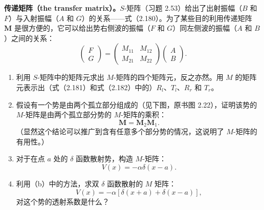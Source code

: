 \textbf{传递矩阵（the transfer matrix）。}$S$-矩阵（习题 2.53）给出了出射振幅（$B$ 和 $F$）与入射振幅（$A$ 和 $G$）的关系——式（2.180）。为了某些目的利用传递矩阵 $\boldsymbol M$ 是很方便的，它可以给出势右侧波的振幅（$F$ 和 $G$）同左侧波的振幅（$A$ 和 $B$）之间的关系：
\[
\begin{pmatrix}F\\G\end{pmatrix}
=\begin{pmatrix}M_{11}&M_{12}\\M_{21}&M_{22}\end{pmatrix}
\begin{pmatrix}A\\B\end{pmatrix}.
\]
\begin{enumerate}
\item 利用 $S$-矩阵中的矩阵元求出 $M$-矩阵的四个矩阵元，反之亦然。用 $M$ 的矩阵元表示出（式（2.181）和式（2.182）中的）$R_l$、$T_l$、$R_r$ 和 $T_r$。
\item 假设有一个势是由两个孤立部分组成的（见下图，原书图 2.22），证明该势的 $M$-矩阵是由两个孤立部分势的 $M$-矩阵的乘积：
\[
\boldsymbol M=\boldsymbol M_2\boldsymbol M_1.
\]
（显然这个结论可以推广到含有任意多个部分势的情况，这说明了 $M$-矩阵的有用性。）
\item 对于在点 $a$ 处的 $\delta$ 函数散射势，构造 $M$-矩阵：
\[
V(x)=-\alpha\delta(x-a).
\]
\item 利用（b）中的方法，求双 $\delta$ 函数散射的 $M$ 矩阵：
\[
V(x)=-\alpha[\delta(x+a)+\delta(x-a)],
\]
对这个势的透射系数是什么？
\end{enumerate}
\begin{center}

\par{}
\end{center}
\vfill
